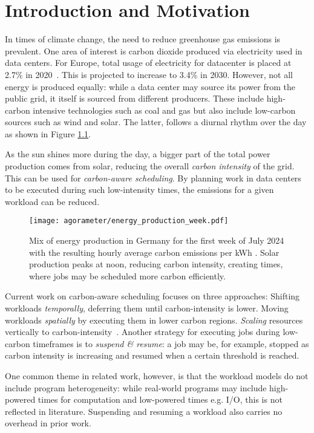 \chapter{Introduction and Motivation}

In times of climate change, the need to reduce greenhouse gas emissions is prevalent. 
One area of interest is carbon dioxide produced via electricity used in data centers. 
For Europe, total usage of electricity for datacenter is placed at 2.7\% in 2020~.  
This is projected to increase to 3.4\% in 2030.
However, not all energy is produced equally: while a data center may source its power from the public grid, it itself is sourced from different producers. 
These include high-carbon intensive technologies such as coal and gas but also include low-carbon sources such as wind and solar. 
The latter, follows a diurnal rhythm over the day as shown in Figure \ref{fig:energy_mix}.

As the sun shines more during the day, a bigger part of the total power production comes from solar, reducing the overall \emph{carbon intensity} of the grid.
This can be used for \emph{carbon-aware scheduling}. 
By planning work in data centers to be executed during such low-intensity times, the emissions for a given workload can be reduced.
 
\begin{figure}[H] %
    \texttt{[image: agorameter/energy\_production\_week.pdf]}
    \caption[short]{Mix of energy production in Germany for the first week of July 2024 with the resulting hourly average carbon emissions per kWh . Solar production peaks at noon, reducing carbon intensity, creating times, where jobs may be scheduled more carbon efficiently.}
    \label{fig:energy_mix}
\end{figure}

Current work on carbon-aware scheduling focuses on three approaches:
Shifting workloads \emph{temporally}, deferring them until carbon-intensity is lower.
Moving workloads \emph{spatially} by executing them in lower carbon regions.
\emph{Scaling} resources vertically to carbon-intensity~\cite{thiede_carbon_2023,jacob_does_2023}.
Another strategy for executing jobs during low-carbon timeframes is to \emph{suspend \& resume}: a job may be, for example, stopped as carbon intensity is increasing and resumed when a certain threshold is reached. 

One common theme in related work, however, is that the workload models do not include program heterogeneity: while real-world programs may include high-powered times for computation and low-powered times e.g. I/O, this is not reflected in literature. 
Suspending and resuming a workload also carries no overhead in prior work. 


